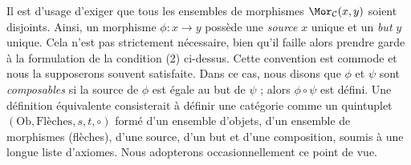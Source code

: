 \noindent
Il est d'usage d'exiger que tous les ensembles de morphismes
$\Mor_\mathcal{C}(x, y)$ soient disjoints.
Ainsi, un morphisme $\phi : x \to y$ possède une {\it source} $x$
unique et un {\it but} $y$ unique. Cela n'est pas strictement nécessaire,
bien qu'il faille alors prendre garde à la formulation de la condition (2)
ci-dessus. Cette convention est commode et nous la supposerons souvent
satisfaite. Dans ce cas, nous disons que $\phi$ et $\psi$ sont
{\it composables} si la source de $\phi$ est égale au
but de $\psi$ ; alors $\phi \circ \psi$ est défini.
Une définition équivalente consisterait à définir une catégorie
comme un quintuplet $(\text{Ob}, \text{Flèches}, s, t, \circ)$
formé d'un ensemble d'objets, d'un ensemble de morphismes (flèches),
d'une source, d'un but et d'une composition, soumis à une longue liste
d'axiomes. Nous adopterons occasionnellement ce point de vue.

